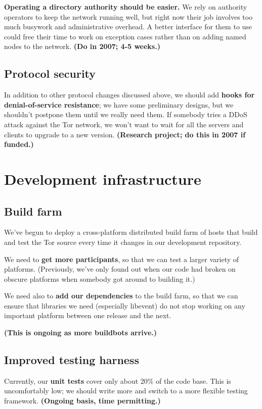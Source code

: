 \documentclass{article}
\newcommand{\plan}[1]{ {\bf (#1)}}
\begin{document}
{\bf Operating a directory authority should be easier.}  We rely on authority
operators to keep the network running well, but right now their job involves
too much busywork and administrative overhead.  A better interface for them
to use could free their time to work on exception cases rather than on
adding named nodes to the network.\plan{Do in 2007; 4-5 weeks.}

\subsection{Protocol security}

In addition to other protocol changes discussed above,
we should add {\bf hooks for denial-of-service resistance}; we have some
preliminary designs, but we shouldn't postpone them until we really need them.
If somebody tries a DDoS attack against the Tor network, we won't want to
wait for all the servers and clients to upgrade to a new
version.\plan{Research project; do this in 2007 if funded.}

\section{Development infrastructure}

\subsection{Build farm}
We've begun to deploy a cross-platform distributed build farm of hosts
that build and test the Tor source every time it changes in our development
repository.

We need to {\bf get more participants}, so that we can test a larger variety
of platforms.  (Previously, we've only found out when our code had broken on
obscure platforms when somebody got around to building it.)

We need also to {\bf add our dependencies} to the build farm, so that we can
ensure that libraries we need (especially libevent) do not stop working on
any important platform between one release and the next.

\plan{This is ongoing as more buildbots arrive.}

\subsection{Improved testing harness}
Currently, our {\bf unit tests} cover only about 20\% of the code base.  This
is uncomfortably low; we should write more and switch to a more flexible
testing framework.\plan{Ongoing basis, time permitting.}
\end{document}
